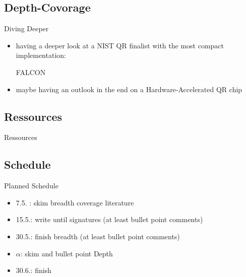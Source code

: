 \documentclass[ucs,10pt]{beamer}
\begin{document}
\subsection{Depth-Covorage}
\begin{frame}{Diving Deeper}
  \begin{itemize}
    \item  having a deeper look at a NIST QR finalist with the most compact implementation:

    FALCON \cite{falcon_and_dilithium,falcon_micro_impl,bearz}
   
    \item  maybe having an outlook in the end on a Hardware-Accelerated QR chip \cite{IoT_ASIC} 
  \end{itemize}

\end{frame}

\subsection{Ressources}
\begin{frame}[allowframebreaks]{Ressources}
  
  
\end{frame}

\subsection{Schedule}
\begin{frame}{Planned Schedule}
\begin{itemize}
  \item 7.5. : skim breadth coverage literature
  \item 15.5.: write until signatures (at least bullet point comments)
  \item 30.5.: finish breadth (at least bullet point comments)
  \item $\alpha$: skim and bullet point Depth
  \item 30.6.: finish
\end{itemize}
\end{frame}
\end{document}
